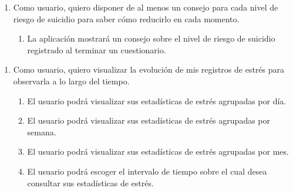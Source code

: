         \begin{enumerate}[resume=req-usuario,label=\textbf{\texttt{RU-\arabic*}}]
            \item \label{req:usuario:consejo_suicidio} Como usuario, quiero disponer de al menos un consejo para cada nivel de riesgo de suicidio para saber cómo reducirlo en cada momento.
            \begin{enumerate}[resume=req-funcionales,label=\textbf{\texttt{RF-\arabic*}}]
                \item \label{req:funcionales:consejo_cuestionario_suicidio} La aplicación mostrará un consejo sobre el nivel de riesgo de suicidio registrado al terminar un cuestionario.
            \end{enumerate}
        \end{enumerate}
        \begin{enumerate}[resume=req-usuario,label=\textbf{\texttt{RU-\arabic*}}]
            \item \label{req:usuario:evolucion_estres}  Como usuario, quiero visualizar la evolución de mis registros de estrés para observarla a lo largo del tiempo.
            \begin{enumerate}[resume=req-funcionales,label=\textbf{\texttt{RF-\arabic*}}]
                \item \label{req:funcionales:evolucion_estres_dia} El usuario podrá visualizar sus estadísticas de estrés agrupadas por día.
                \item \label{req:funcionales:evolucion_estres_semana} El usuario podrá visualizar sus estadísticas de estrés agrupadas por semana.
                \item \label{req:funcionales:evolucion_estres_mes} El usuario podrá visualizar sus estadísticas de estrés agrupadas por mes.
                \item \label{req:funcionales:evolucion_estres_elegir} El usuario podrá escoger el intervalo de tiempo sobre el cual desea consultar sus estadísticas de estrés.
            \end{enumerate}
        \end{enumerate}
